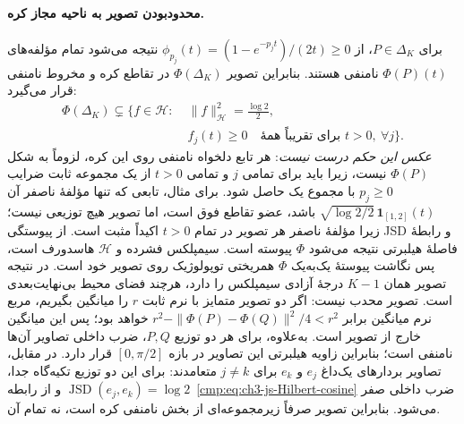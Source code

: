 \paragraph{محدودبودن تصویر به ناحیه مجاز کره.}
برای $P\in\Delta_K$، از
$\phi_{p_j}(t)=(1-e^{-p_jt})/(2t)\ge0$
نتیجه می‌شود تمام مؤلفه‌های
$\Phi(P)(t)$ نامنفی هستند. بنابراین
تصویر $\Phi(\Delta_K)$ در تقاطع کره و مخروط نامنفی قرار می‌گیرد:
\begin{equation}\label{cmp:eq:ch3-js-positive-spherical-image}
\begin{aligned}
\Phi(\Delta_K)\subsetneq\{f\in\mathcal H:\;&
\|f\|_{\mathcal H}^2=\tfrac{\log2}{2},\\
&f_j(t)\ge0\quad\text{برای تقریباً همهٔ }t>0,\ \forall j\}.
\end{aligned}
\end{equation}
\emph{عکس این حکم درست نیست}:
هر تابع دلخواه نامنفی روی این کره،
لزوماً به شکل $\Phi(P)$ نیست،
زیرا باید برای تمامی $j$ و تمامی
$t>0$ از یک مجموعه ثابت ضرایب
$p_j\ge0$ با مجموع یک حاصل شود.
برای مثال، تابعی که تنها مؤلفهٔ ناصفر آن
$\sqrt{\log2/2}\,\mathbf1_{[1,2]}(t)$ باشد، عضو تقاطع فوق است، اما تصویر هیچ توزیعی نیست؛ زیرا مؤلفهٔ ناصفر هر تصویر در تمام $t>0$ اکیداً مثبت است.
از پیوستگی JSD و رابطهٔ فاصلهٔ هیلبرتی نتیجه می‌شود $\Phi$ پیوسته است. سیمپلکس فشرده و $\mathcal H$ هاسدورف است، پس نگاشت پیوستهٔ یک‌به‌یک $\Phi$ همریختی توپولوژیک روی تصویر خود است. در نتیجه تصویر همان $K-1$ درجهٔ آزادی سیمپلکس را دارد، هرچند فضای محیط بی‌نهایت‌بعدی است. تصویر محدب نیست: اگر دو تصویر متمایز با نرم ثابت $r$ را میانگین بگیریم، مربع نرم میانگین برابر $r^2-\|\Phi(P)-\Phi(Q)\|^2/4<r^2$ خواهد بود؛ پس این میانگین خارج از تصویر است.
به‌علاوه، برای هر دو توزیع
$P,Q$، ضرب داخلی تصاویر آن‌ها
نامنفی است؛ بنابراین زاویه هیلبرتی
این تصاویر در بازه $[0,\pi/2]$ قرار دارد.
در مقابل، تصاویر بردارهای یک‌داغ
$e_j$ و $e_k$ برای $j\ne k$
متعامدند: برای این دو توزیع
تکیه‌گاه جدا، $\operatorname{JSD}(e_j,e_k)=\log2$
و از رابطه~\eqref{cmp:eq:ch3-js-Hilbert-cosine}
ضرب داخلی صفر می‌شود.
بنابراین تصویر صرفاً زیرمجموعه‌ای از بخش نامنفی کره است، نه تمام آن.

